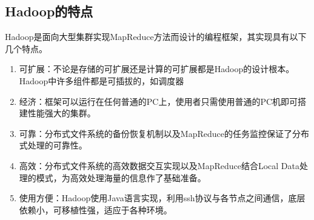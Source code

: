 
\subsection{Hadoop的特点}
Hadoop是面向大型集群实现MapReduce方法而设计的编程框架，其实现具有以下几个特点。

\begin{enumerate}
\item 可扩展：不论是存储的可扩展还是计算的可扩展都是Hadoop的设计根本。Hadoop中许多组件都是可插拔的，如调度器

\item 经济：框架可以运行在任何普通的PC上，使用者只需使用普通的PC机即可搭建性能强大的集群。

\item 可靠：分布式文件系统的备份恢复机制以及MapReduce的任务监控保证了分布式处理的可靠性。

\item 高效：分布式文件系统的高效数据交互实现以及MapReduce结合Local Data处理的模式，为高效处理海量的信息作了基础准备。

\item 使用方便：Hadoop使用Java语言实现，利用ssh协议与各节点之间通信，底层依赖小，可移植性强，适应于各种环境。
\end{enumerate}

